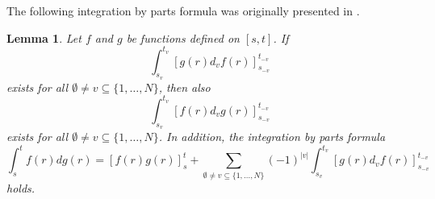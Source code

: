 \documentclass[english, a4paper, 12pt,reqno]{amsart}
\newtheorem{defi}{Definition}[section]
\newtheorem{lemma}[defi]{Lemma}
\begin{document}
The following integration by parts formula was originally presented in \cite{young1917multiple}.
\begin{lemma}
\label{lemma:ipp}
Let $f$ and $g$ be functions defined on $[s,t]$. If
\begin{equation*}
\int_{s_v}^{t_v}[g(r) d_vf(r)]_{s_{-v}}^{t_{-v}}
\end{equation*}
exists for all $\emptyset \neq v \subseteq \{1,\dots,N\}$, then also
\begin{equation*}
\int_{s_v}^{t_v}[f(r) d_vg(r)]_{s_{-v}}^{t_{-v}}
\end{equation*}
exists for all $\emptyset \neq v \subseteq \{1,\dots,N\}$. In addition, the integration by parts formula 
\begin{equation}
\label{iip}
\int_s^t f(r) dg(r) = [f(r)g(r)]_s^t + \sum_{\emptyset\neq v \subseteq \{1,\dots,N\}}(-1)^{|v|} \int_{s_v}^{t_v} [g(r)d_vf(r)]_{s_{-v}}^{t_{-v}}
\end{equation}
holds.
\end{lemma}

\end{document}
